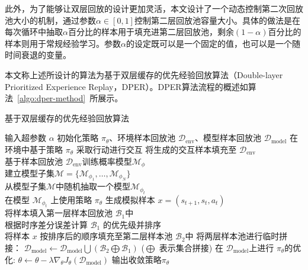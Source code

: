 此外，为了能够让双层回放的设计更加灵活，本文设计了一个动态控制第二次回放池大小的机制，通过参数$\alpha\in[0,1]$控制第二层回放池容量大小。具体的做法是在每次循环中抽取$\alpha$百分比的样本用于填充进第二层回放池，剩余$(1-\alpha)$百分比的样本则用于常规经验学习。参数$\alpha$的设定既可以是一个固定的值，也可以是一个随时间衰退的变量。

本文称上述所设计的算法为基于双层缓存的优先经验回放算法（Double-layer Prioritized Experience Replay，DPER）。DPER算法流程的概述如算法~\ref{algo:dper-method}~所展示。

\begin{algorithm}[ht]
\caption{基于双层缓存的优先经验回放算法}
\label{algo:dper-method}
\begin{algorithmic}
\STATE 输入超参数 $\alpha$
\STATE 初始化策略 $\pi_\theta$、环境样本回放池
$\mathcal{D}_{\mathrm{env}}$、模型样本回放池 $\mathcal{D}_{\mathrm{model}}$
    \STATE 在环境中基于策略 $\pi_\theta$ 采取行动进行交互
    \STATE 将生成的交互样本填充至 $\mathcal{D}_{\mathrm{env}}$\\
        \STATE 基于样本回放池 $\mathcal{D}_{\mathrm{env}}$训练概率模型$\mathcal{M}_\phi$\\
        \STATE 建立模型子集$\mathcal{M} = \{\mathcal{M}_{\phi_1},\ldots,\mathcal{M}_{\phi_{N}}\}$\\
            \STATE 从模型子集$\mathcal{M}$中随机抽取一个模型$\mathcal{M}_{\phi_t}$\\
            \STATE 在模型 $\mathcal{M}_{\phi_t}$ 上使用策略 $\pi_\theta$ 生成模拟样本 $x=\left(s_{t+1},s_t,a_t\right)$ \\
            \STATE 将样本填入第一层样本回放池 $\mathcal{B}_1$中\\
        \ENDFOR
        \STATE 根据时序差分误差计算 $\mathcal{B}_1$ 的优先级并排序\\
                \STATE 将样本 $x$ 按排序后的顺序填充至第二层样本池 $\mathcal{B}_{2}$中
            \ENDIF
        \ENDFOR
        \STATE 将两层样本池进行临时拼接： $\mathcal{D}_{\mathrm{model}}\leftarrow\mathcal{D}_{\mathrm{model}}\bigcup(\mathcal{B}_2\bigoplus\mathcal{B}_1)$ ($\bigoplus$ 表示集合拼接)
    \ENDFOR
    \STATE 在 $\mathcal{D}_{\mathrm{model}}$上进行 $\pi_\theta$的优化: $\theta\leftarrow \theta - \lambda\nabla_\theta J_\theta(\mathcal{D}_{\mathrm{model}})$
\ENDFOR
\STATE 输出收敛策略$\pi_\theta$
\end{algorithmic}
\end{algorithm}

